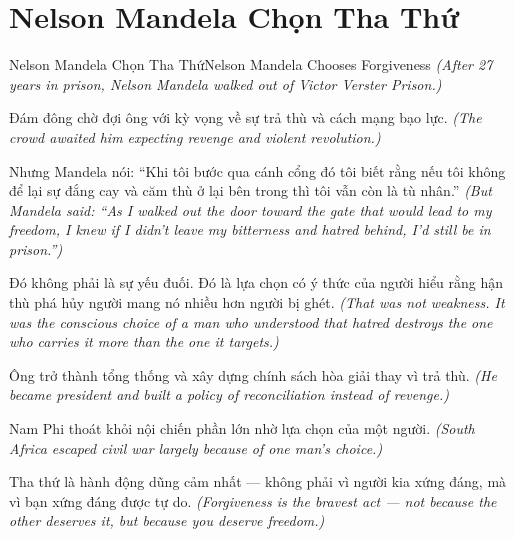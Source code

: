 \section{Nelson Mandela Chọn Tha Thứ}
\begin{truyen}{Nelson Mandela Chọn Tha Thứ}{Nelson Mandela Chooses Forgiveness}
\textit{(After 27 years in prison, Nelson Mandela walked out of Victor Verster Prison.)}

Đám đông chờ đợi ông với kỳ vọng về sự trả thù và cách mạng bạo lực.
\textit{(The crowd awaited him expecting revenge and violent revolution.)}

Nhưng Mandela nói: ``Khi tôi bước qua cánh cổng đó tôi biết rằng nếu tôi không để lại sự đắng cay và căm thù ở lại bên trong thì tôi vẫn còn là tù nhân.''
\textit{(But Mandela said: ``As I walked out the door toward the gate that would lead to my freedom, I knew if I didn't leave my bitterness and hatred behind, I'd still be in prison.'')}

Đó không phải là sự yếu đuối. Đó là lựa chọn có ý thức của người hiểu rằng hận thù phá hủy người mang nó nhiều hơn người bị ghét.
\textit{(That was not weakness. It was the conscious choice of a man who understood that hatred destroys the one who carries it more than the one it targets.)}

Ông trở thành tổng thống và xây dựng chính sách hòa giải thay vì trả thù.
\textit{(He became president and built a policy of reconciliation instead of revenge.)}

Nam Phi thoát khỏi nội chiến phần lớn nhờ lựa chọn của một người.
\textit{(South Africa escaped civil war largely because of one man's choice.)}

\end{truyen}

\begin{baihoc}
Tha thứ là hành động dũng cảm nhất — không phải vì người kia xứng đáng, mà vì bạn xứng đáng được tự do.
\textit{(Forgiveness is the bravest act — not because the other deserves it, but because you deserve freedom.)}
\end{baihoc}
\ngancach

